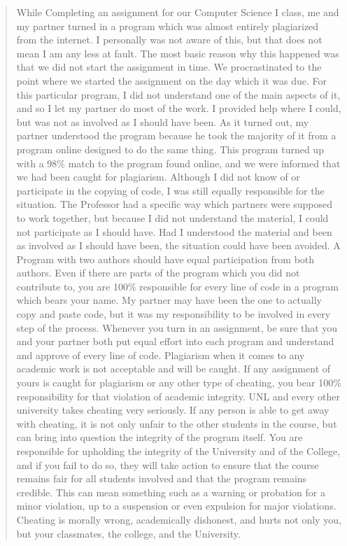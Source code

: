 \documentclass[12pt]{scrartcl}
\begin{document}
\begin{quote}
	While Completing an assignment for our Computer Science I class, me and my partner turned in a program which was almost entirely plagiarized from the internet.  I personally was not aware of this, but that does not mean I am any less at fault.  The most basic reason why this happened was that we did not start the assignment in time.  We procrastinated to the point where we started the assignment on the day which it was due.  For this particular program, I did not understand one of the main aspects of it, and so I let my partner do most of the work.  I provided help where I could, but was not as involved as I should have been.  As it turned out, my partner understood the program because he took the majority of it from a program online designed to do the same thing.  This program turned up with a 98\% match to the program found online, and we were informed that we had been caught for plagiarism.
	Although I did not know of or participate in the copying of code, I was still equally responsible for the situation.  The Professor had a specific way which partners were supposed to work together, but because I did not understand the material, I could not participate as I should have.  Had I understood the material and been as involved as I should have been, the situation could have been avoided.  A Program with two authors should have equal participation from both authors.  Even if there are parts of the program which you did not contribute to, you are 100\% responsible for every line of code in a program which bears your name.  My partner may have been the one to actually copy and paste code, but it was my responsibility to be involved in every step of the process.  Whenever you turn in an assignment, be sure that you and your partner both put equal effort into each program and understand and approve of every line of code.
	Plagiarism when it comes to any academic work is not acceptable and will be caught.  If any assignment of yours is caught for plagiarism or any other type of cheating, you bear 100\% responsibility for that violation of academic integrity.  UNL and every other university takes cheating very seriously.  If any person is able to get away with cheating, it is not only unfair to the other students in the course, but can bring into question the integrity of the program itself.  You are responsible for upholding the integrity of the University and of the College, and if you fail to do so, they will take action to ensure that the course remains fair for all students involved and that the program remains credible.  This can mean something such as a warning or probation for a minor violation, up to a suspension or even expulsion for major violations.  Cheating is morally wrong, academically dishonest, and hurts not only you, but your classmates, the college, and the University.

\end{quote}
\end{document}
